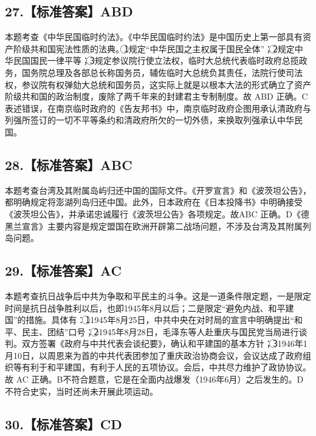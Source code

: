 \documentclass[UTF8,11pt]{ctexart}
\begin{document}
\subsection*{27.【标准答案】ABD}

本题考查《中华民国临时约法》。《中华民国临时约法》是中国历史上第一部具有资产阶级共和国宪法性质的法典。\textcircled{1}规定“中华民国之主权属于国民全体”；\textcircled{2}规定中华民国国民一律平等；\textcircled{3}规定参议院行使立法权，临时大总统代表临时政府总揽政务，国务院总理及各部总长称国务员，辅佐临时大总统负其责任，法院行使司法权，参议院有权弹劾大总统和国务员，这实际上就是以根本大法的形式确立了资产阶级共和国的政治制度，废除了两千年来的封建君主专制制度。故 ABD 正确。C表述错误，在南京临时政府的《告友邦书》中，南京临时政府企图用承认清政府与列强所签订的一切不平等条约和清政府所欠的一切外债，来换取列强承认中华民国。


\subsection*{28.【标准答案】ABC}

本题考查台湾及其附属岛屿归还中国的国际文件。《开罗宣言》和《波茨坦公告》，都明确规定将澎湖列岛归还中国。此外，日本政府在《日本投降书》中明确接受《波茨坦公告》，并承诺忠诚履行《波茨坦公告》各项规定。故ABC 正确。D《德黑兰宣言》主要内容是规定盟国在欧洲开辟第二战场问题，不涉及台湾及其附属列岛问题。


\subsection*{29.【标准答案】AC}

本题考查抗日战争后中共为争取和平民主的斗争。这是一道条件限定题，一是限定时间是抗日战争胜利以后，也即1945年8月以后；二是限定“避免内战、和平建国”的措施。具体有：\textcircled{1}1945年8月25日，中共中央在对时局的宣言中明确提出“和平、民主、团结”口号；\textcircled{2}1945年8月28日，毛泽东等人赴重庆与国民党当局进行谈判。双方签署《政府与中共代表会谈纪要》，确认和平建国的基本方针；\textcircled{3}1946年1月10日，以周恩来为首的中共代表团参加了重庆政治协商会议，会议达成了政府组织等有利于和平建国，有利于人民的五项协议。会后，中共尽力维护了政协协议。故 AC 正确。B不符合题意，它是在全面内战爆发（1946年6月）之后发生的。D不符合史实，当时还尚未开展此项运动。


\subsection*{30.【标准答案】CD}
\end{document}
